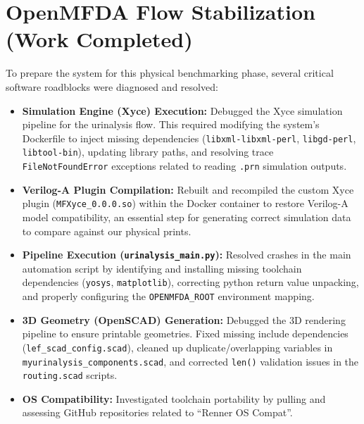 \documentclass[11pt,a4paper]{article}
\begin{document}
\section*{OpenMFDA Flow Stabilization (Work Completed)}
To prepare the system for this physical benchmarking phase, several critical software roadblocks were diagnosed and resolved:

\begin{itemize}[label=\textcolor{secondary}{$\bullet$}, itemsep=0.4em]
    \item \textbf{Simulation Engine (Xyce) Execution:} Debugged the Xyce simulation pipeline for the urinalysis flow. This required modifying the system's Dockerfile to inject missing dependencies (\texttt{libxml-libxml-perl}, \texttt{libgd-perl}, \texttt{libtool-bin}), updating library paths, and resolving trace \texttt{FileNotFoundError} exceptions related to reading \texttt{.prn} simulation outputs.
    \item \textbf{Verilog-A Plugin Compilation:} Rebuilt and recompiled the custom Xyce plugin (\texttt{MFXyce\_0.0.0.so}) within the Docker container to restore Verilog-A model compatibility, an essential step for generating correct simulation data to compare against our physical prints.
    \item \textbf{Pipeline Execution (\texttt{urinalysis\_main.py}):} Resolved crashes in the main automation script by identifying and installing missing toolchain dependencies (\texttt{yosys}, \texttt{matplotlib}), correcting python return value unpacking, and properly configuring the \texttt{OPENMFDA\_ROOT} environment mapping.
    \item \textbf{3D Geometry (OpenSCAD) Generation:} Debugged the 3D rendering pipeline to ensure printable geometries. Fixed missing include dependencies (\texttt{lef\_scad\_config.scad}), cleaned up duplicate/overlapping variables in \texttt{myurinalysis\_components.scad}, and corrected \texttt{len()} validation issues in the \texttt{routing.scad} scripts.
    \item \textbf{OS Compatibility:} Investigated toolchain portability by pulling and assessing GitHub repositories related to ``Renner OS Compat''.
\end{itemize}
\end{document}
